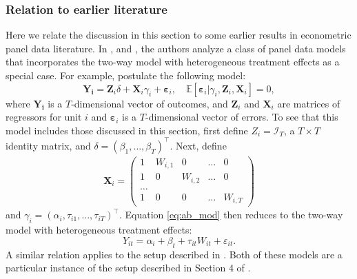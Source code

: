 \documentclass[letterpaper,12pt,leqno]{article}
\begin{document}
\subsubsection{Relation to earlier literature}


Here we relate the discussion in this section to some earlier results in econometric panel data literature. In \citep{chamberlain1992efficiency}, \citep{graham2012identification} and \citep{arellano2011identifying}, the authors analyze a class of panel data models that incorporates the two-way model with heterogeneous treatment effects as a special case. For example, \citep{arellano2011identifying} postulate the following model:
\begin{equation}\label{eq:ab_mod}
    \mathbf{Y_i} = \mathbf{Z}_i \delta + \mathbf{X}_i \gamma_i + \boldsymbol{\varepsilon}_{i}, \quad \mathbb{E}[\boldsymbol{\varepsilon}_{i}|\gamma_i, \mathbf{Z}_i, \mathbf{X}_i] = 0,
\end{equation}
where $ \mathbf{Y_i}$ is a $T$-dimensional vector of outcomes, and $\mathbf{Z}_i$ and $\mathbf{X}_i$ are matrices of regressors for unit $i$ and $\boldsymbol{\varepsilon}_{i}$ is a $T$-dimensional vector of errors.  To see that this model includes those discussed in this section, first define $Z_i = \mathcal{I}_{T}$, a $T\times T$ identity matrix, and $\delta = (\beta_1, \dots, \beta_{T})^\top$. Next, define 
\begin{align*}
    \mathbf{X}_i =\begin{pmatrix} 1 & W_{i,1} & 0& \dots& 0 \\
                                  1 & 0 & W_{i,2} & \dots& 0\\
                                  \dots \\
                                  1 & 0 & 0 & \dots & W_{i,T}\end{pmatrix}
\end{align*}
and $\gamma_i = (\alpha_i, \tau_{i1},\dots, \tau_{iT})^\top$. Equation \eqref{eq:ab_mod} then reduces to the two-way model with heterogeneous treatment effects:
\begin{equation*}
    Y_{it} = \alpha_i + \beta_t + \tau_{it}W_{it} + \varepsilon_{it}.
\end{equation*}
A similar relation applies to the setup described in \citep{graham2012identification}. Both of these models are a particular instance of the setup described in Section 4 of \citep{chamberlain1992efficiency}.
\end{document}
